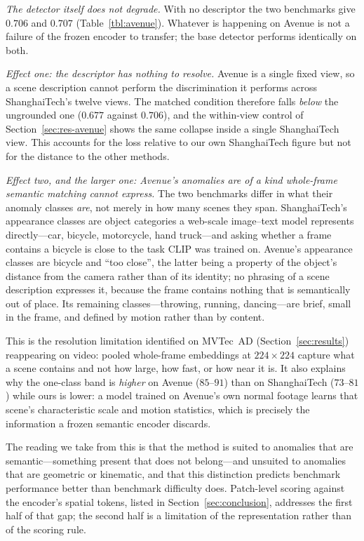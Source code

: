 \documentclass[a4paper,fleqn]{cas-sc}
\begin{document}
\emph{The detector itself does not degrade.} With no descriptor the two
benchmarks give $0.706$ and $0.707$ (Table~\ref{tbl:avenue}). Whatever is
happening on Avenue is not a failure of the frozen encoder to transfer; the
base detector performs identically on both.

\emph{Effect one: the descriptor has nothing to resolve.} Avenue is a single
fixed view, so a scene description cannot perform the discrimination it performs
across ShanghaiTech's twelve views. The matched condition therefore falls
\emph{below} the ungrounded one ($0.677$ against $0.706$), and the within-view
control of Section~\ref{sec:res-avenue} shows the same collapse inside a single
ShanghaiTech view. This accounts for the loss relative to our own ShanghaiTech
figure but not for the distance to the other methods.

\emph{Effect two, and the larger one: Avenue's anomalies are of a kind
whole-frame semantic matching cannot express.} The two benchmarks differ in what
their anomaly classes \emph{are}, not merely in how many scenes they span.
ShanghaiTech's appearance classes are object categories a web-scale
image--text model represents directly---car, bicycle, motorcycle, hand
truck---and asking whether a frame contains a bicycle is close to the task CLIP
was trained on. Avenue's appearance classes are bicycle and ``too close'',
the latter being a property of the object's distance from the camera rather
than of its identity; no phrasing of a scene description expresses it, because
the frame contains nothing that is semantically out of place. Its remaining
classes---throwing, running, dancing---are brief, small in the frame, and
defined by motion rather than by content.

This is the resolution limitation identified on MVTec~AD
(Section~\ref{sec:results}) reappearing on video: pooled whole-frame embeddings
at $224\times224$ capture what a scene contains and not how large, how fast, or
how near it is. It also explains why the one-class band is \emph{higher} on
Avenue ($85$--$91$) than on ShanghaiTech ($73$--$81$) while ours is lower: a
model trained on Avenue's own normal footage learns that scene's characteristic
scale and motion statistics, which is precisely the information a frozen
semantic encoder discards.

The reading we take from this is that the method is suited to anomalies that are
semantic---something present that does not belong---and unsuited to anomalies
that are geometric or kinematic, and that this distinction predicts benchmark
performance better than benchmark difficulty does. Patch-level scoring against
the encoder's spatial tokens, listed in Section~\ref{sec:conclusion}, addresses
the first half of that gap; the second half is a limitation of the
representation rather than of the scoring rule.
\end{document}

